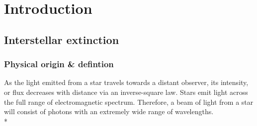 \documentclass[12pt, a4paper]{report}
\begin{document}
\chapter{Introduction}
\section{Interstellar extinction} \label{ext_def}
\subsection{Physical origin \& defintion}
As the light emitted from a star travels towards a distant observer, its intensity, or flux decreases with distance via an inverse-square law. Stars emit light across the full range of electromagnetic spectrum. Therefore, a beam of light from a star will consist of photons with an extremely wide range of wavelengths. \\*




\end{document}
